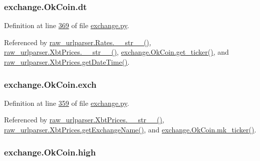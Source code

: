 \subsubsection[{\texorpdfstring{dt}{dt}}]{\setlength{\rightskip}{0pt plus 5cm}exchange.\+Ok\+Coin.\+dt}\hypertarget{classexchange_1_1_ok_coin_ade9d7cddcfa54f2b1ba5452854bfd48b}{}\label{classexchange_1_1_ok_coin_ade9d7cddcfa54f2b1ba5452854bfd48b}


Definition at line \hyperlink{exchange_8py_source_l00369}{369} of file \hyperlink{exchange_8py_source}{exchange.\+py}.



Referenced by \hyperlink{raw__urlparser_8py_source_l00038}{raw\+\_\+urlparser.\+Rates.\+\_\+\+\_\+str\+\_\+\+\_\+()}, \hyperlink{raw__urlparser_8py_source_l00074}{raw\+\_\+urlparser.\+Xbt\+Prices.\+\_\+\+\_\+str\+\_\+\+\_\+()}, \hyperlink{exchange_8py_source_l00371}{exchange.\+Ok\+Coin.\+get\+\_\+ticker()}, and \hyperlink{raw__urlparser_8py_source_l00059}{raw\+\_\+urlparser.\+Xbt\+Prices.\+get\+Date\+Time()}.

\subsubsection[{\texorpdfstring{exch}{exch}}]{\setlength{\rightskip}{0pt plus 5cm}exchange.\+Ok\+Coin.\+exch}\hypertarget{classexchange_1_1_ok_coin_a22678c192b53ddf34e8a636e0cdaf4d4}{}\label{classexchange_1_1_ok_coin_a22678c192b53ddf34e8a636e0cdaf4d4}


Definition at line \hyperlink{exchange_8py_source_l00359}{359} of file \hyperlink{exchange_8py_source}{exchange.\+py}.



Referenced by \hyperlink{raw__urlparser_8py_source_l00074}{raw\+\_\+urlparser.\+Xbt\+Prices.\+\_\+\+\_\+str\+\_\+\+\_\+()}, \hyperlink{raw__urlparser_8py_source_l00068}{raw\+\_\+urlparser.\+Xbt\+Prices.\+get\+Exchange\+Name()}, and \hyperlink{exchange_8py_source_l00385}{exchange.\+Ok\+Coin.\+mk\+\_\+ticker()}.

\subsubsection[{\texorpdfstring{high}{high}}]{\setlength{\rightskip}{0pt plus 5cm}exchange.\+Ok\+Coin.\+high}\hypertarget{classexchange_1_1_ok_coin_af9d9dbcfc86404510e7f9a5704e8eecd}{}\label{classexchange_1_1_ok_coin_af9d9dbcfc86404510e7f9a5704e8eecd}


